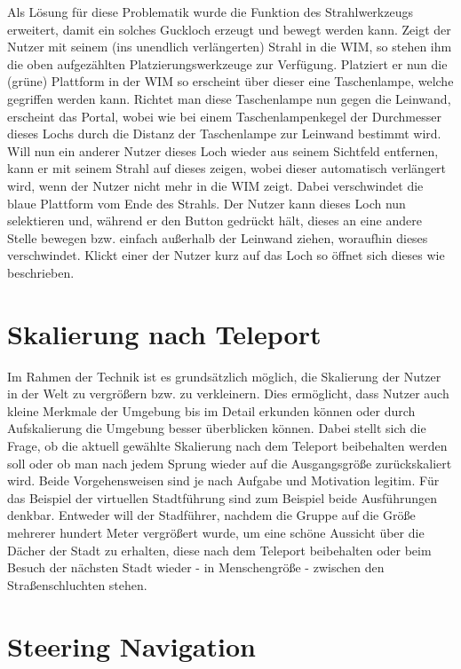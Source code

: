 Als Lösung für diese Problematik wurde die Funktion des Strahlwerkzeugs erweitert, damit ein solches \glqq Guckloch\grqq{} erzeugt und bewegt werden kann.
Zeigt der Nutzer mit seinem (ins unendlich verlängerten) Strahl in die WIM, so stehen ihm die oben aufgezählten Platzierungswerkzeuge zur Verfügung. Platziert er nun die (grüne) Plattform in der WIM so erscheint über dieser eine Taschenlampe, welche gegriffen werden kann. Richtet man diese Taschenlampe nun gegen die Leinwand, erscheint das Portal, wobei wie bei einem Taschenlampenkegel der Durchmesser dieses Lochs durch die Distanz der Taschenlampe zur Leinwand bestimmt wird. Will nun ein anderer Nutzer dieses Loch wieder aus seinem Sichtfeld entfernen, kann er mit seinem Strahl auf dieses zeigen, wobei dieser automatisch verlängert wird, wenn der Nutzer nicht mehr in die WIM zeigt. Dabei verschwindet die blaue Plattform vom Ende des Strahls. Der Nutzer kann dieses Loch nun selektieren und, während er den Button gedrückt hält, dieses an eine andere Stelle bewegen bzw. einfach außerhalb der Leinwand ziehen, woraufhin dieses verschwindet.
Klickt einer der Nutzer kurz auf das Loch so öffnet sich dieses wie beschrieben.

\section{Skalierung nach Teleport}
Im Rahmen der Technik ist es grundsätzlich möglich, die Skalierung der Nutzer in der Welt zu vergrößern bzw. zu verkleinern. Dies ermöglicht, dass Nutzer auch kleine Merkmale der Umgebung bis im Detail erkunden können oder durch Aufskalierung die Umgebung besser überblicken können. Dabei stellt sich die Frage, ob die aktuell gewählte Skalierung nach dem Teleport beibehalten werden soll oder ob man nach jedem Sprung wieder auf die Ausgangsgröße zurückskaliert wird. Beide Vorgehensweisen sind je nach Aufgabe und Motivation legitim. Für das Beispiel der virtuellen Stadtführung sind zum Beispiel beide Ausführungen denkbar. Entweder will der Stadführer, nachdem die Gruppe auf die Größe mehrerer hundert Meter vergrößert wurde, um eine schöne Aussicht über die Dächer der Stadt zu erhalten, diese nach dem Teleport beibehalten oder beim Besuch der nächsten Stadt wieder - in Menschengröße - zwischen den Straßenschluchten stehen.

\section{Steering Navigation}

